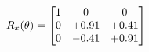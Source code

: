 \documentclass[preview]{standalone}
\begin{document}
\begin{align*}
\special{dvisvgm:raw <g id='unique000'>}R_{x}(\theta) = \begin{bmatrix}1 & 0 & 0 \\0 & +0.91 & +0.41 \\0 & -0.41 & +0.91\end{bmatrix}\special{dvisvgm:raw </g>}
\end{align*}
\end{document}
